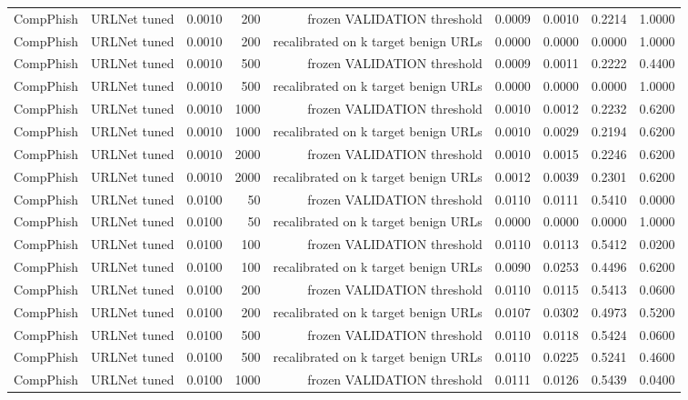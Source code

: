 \begin{table}[t]
\begin{tabular}{llrrrrrrr}
CompPhish & URLNet tuned & 0.0010 & 200 & frozen VALIDATION threshold & 0.0009 & 0.0010 & 0.2214 & 1.0000 \\
CompPhish & URLNet tuned & 0.0010 & 200 & recalibrated on k target benign URLs & 0.0000 & 0.0000 & 0.0000 & 1.0000 \\
CompPhish & URLNet tuned & 0.0010 & 500 & frozen VALIDATION threshold & 0.0009 & 0.0011 & 0.2222 & 0.4400 \\
CompPhish & URLNet tuned & 0.0010 & 500 & recalibrated on k target benign URLs & 0.0000 & 0.0000 & 0.0000 & 1.0000 \\
CompPhish & URLNet tuned & 0.0010 & 1000 & frozen VALIDATION threshold & 0.0010 & 0.0012 & 0.2232 & 0.6200 \\
CompPhish & URLNet tuned & 0.0010 & 1000 & recalibrated on k target benign URLs & 0.0010 & 0.0029 & 0.2194 & 0.6200 \\
CompPhish & URLNet tuned & 0.0010 & 2000 & frozen VALIDATION threshold & 0.0010 & 0.0015 & 0.2246 & 0.6200 \\
CompPhish & URLNet tuned & 0.0010 & 2000 & recalibrated on k target benign URLs & 0.0012 & 0.0039 & 0.2301 & 0.6200 \\
CompPhish & URLNet tuned & 0.0100 & 50 & frozen VALIDATION threshold & 0.0110 & 0.0111 & 0.5410 & 0.0000 \\
CompPhish & URLNet tuned & 0.0100 & 50 & recalibrated on k target benign URLs & 0.0000 & 0.0000 & 0.0000 & 1.0000 \\
CompPhish & URLNet tuned & 0.0100 & 100 & frozen VALIDATION threshold & 0.0110 & 0.0113 & 0.5412 & 0.0200 \\
CompPhish & URLNet tuned & 0.0100 & 100 & recalibrated on k target benign URLs & 0.0090 & 0.0253 & 0.4496 & 0.6200 \\
CompPhish & URLNet tuned & 0.0100 & 200 & frozen VALIDATION threshold & 0.0110 & 0.0115 & 0.5413 & 0.0600 \\
CompPhish & URLNet tuned & 0.0100 & 200 & recalibrated on k target benign URLs & 0.0107 & 0.0302 & 0.4973 & 0.5200 \\
CompPhish & URLNet tuned & 0.0100 & 500 & frozen VALIDATION threshold & 0.0110 & 0.0118 & 0.5424 & 0.0600 \\
CompPhish & URLNet tuned & 0.0100 & 500 & recalibrated on k target benign URLs & 0.0110 & 0.0225 & 0.5241 & 0.4600 \\
CompPhish & URLNet tuned & 0.0100 & 1000 & frozen VALIDATION threshold & 0.0111 & 0.0126 & 0.5439 & 0.0400 \\

\end{tabular}
\end{table}
